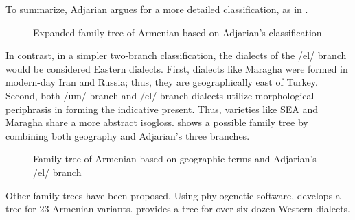 \documentclass[output=paper]{langscibook}
\begin{document}
To summarize, Adjarian argues for a more detailed classification, as in . 

\begin{figure}
	\caption{Expanded family tree of Armenian based on Adjarian's classification}
	\label{tree:dialect:adj}
\end{figure}

\begin{sloppypar}
In contrast, in a simpler two-branch classification, the dialects of the /el/ branch would be considered Eastern dialects. First, dialects like Maragha were formed in modern-day Iran and Russia; thus, they are geographically east of Turkey. Second, both /um/ branch and /el/ branch dialects utilize morphological periphrasis in forming the indicative present. Thus, varieties like SEA and Maragha share a more abstract isogloss.  shows a possible family tree by combining both geography and Adjarian's three branches. 
\end{sloppypar}

\begin{figure}
	\caption{Family tree of Armenian based on geographic terms and Adjarian's /el/ branch}
	\label{tree:dialect:compromise}
\end{figure}

Other family trees have been proposed.  Using phylogenetic software, \citet{DeLisi-2018-ArmenianProsodyDiachrony} develops a tree for 23 Armenian variants. \citet{Balabanian-2024-ThesisDiachronicanalysisWesternArmenianverbalmorphology} provides a tree for over six dozen Western dialects. 
\end{document}
